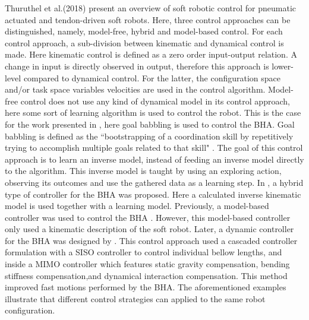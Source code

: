 Thuruthel et al.(2018) \cite{george2018control} present an overview of soft robotic control for pneumatic actuated and tendon-driven soft robots. Here, three control approaches can be distinguished, namely, model-free, hybrid and model-based control. For each control approach, a sub-division between kinematic and dynamical control is made. Here kinematic control is defined as a zero order input-output relation. A change in input is directly observed in output, therefore this approach is lower-level compared to dynamical control. For the latter, the configuration space and/or task space variables velocities are used in the control algorithm. Model-free
control does not use any kind of dynamical model in its control approach, here some sort of learning algorithm is used to control the robot. This is the case for the work presented in \cite{rolf2013efficient}, here goal babbling is used to control the BHA. Goal babbling is defined as the ``bootstrapping of a coordination skill by repetitively trying to accomplish multiple goals related to that skill" \cite{rolf2012goal}. The goal of this control approach is to learn an inverse model, instead of feeding an inverse model directly to the algorithm. This inverse model is taught by using an exploring action, observing its outcomes and use the gathered data as a learning step. In \cite{reinhart2017hybrid}, a hybrid type of controller for the BHA was proposed. Here a calculated inverse kinematic model is used together with a learning model. Previously, a model-based controller was used to control the BHA \cite{mahl2014bhakin}. However, this model-based controller only used a kinematic description of the soft robot. Later, a dynamic controller for the BHA was designed by \cite{falkenhahn2016dynamic}. This control approach used a cascaded controller formulation with a SISO controller to control individual bellow lengths, and inside a MIMO controller which features static gravity compensation, bending stiffness compensation,and dynamical interaction compensation. This method improved fast motions performed by the BHA. The aforementioned examples illustrate that different control strategies can applied to the same robot configuration. 














